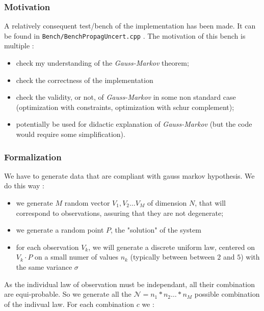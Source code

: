 \subsubsection{Motivation}
A relatively consequent test/bench of the implementation has been made. 
It can be found in {\tt Bench/BenchPropagUncert.cpp} . The motivation
of this bench is multiple :

\begin{itemize}
     \item check my understanding of the \emph{Gauss-Markov} theorem;
     \item check the correctness of the implementation
     \item check the  validity, or not, of \emph{Gauss-Markov} in some non
	     standard case (optimization with constraints, optimization with schur complement);
     \item potentially be used for didactic explanation of \emph{Gauss-Markov}
	     (but the code would require some simplification).
\end{itemize}

\subsubsection{Formalization}

We have to generate data that are compliant with  gauss markov hypothesis. We do this way :

\begin{itemize}
     \item we generate $M$ random vector $V_1,V_2 \dots V_M$ of dimension $N$, that will correspond to 
           observations, assuring that they are not degenerate;

     \item we generate a random point $P$, the "solution" of the system

     \item for each observation  $V_k$, we will generate a discrete uniform law, centered on $V_k \cdot P$
	    on a small numer of values $n_k$ (typically between between $2$ and $5$) with the same variance $\sigma$
\end{itemize}

As the individual law of observation must be independant, all their combination are equi-probable. So
we generate all the $\mathcal{N} = n_1 * n_2 \dots * n_M$ possible combination of the indivual law.  For each
combination $c$  we :

